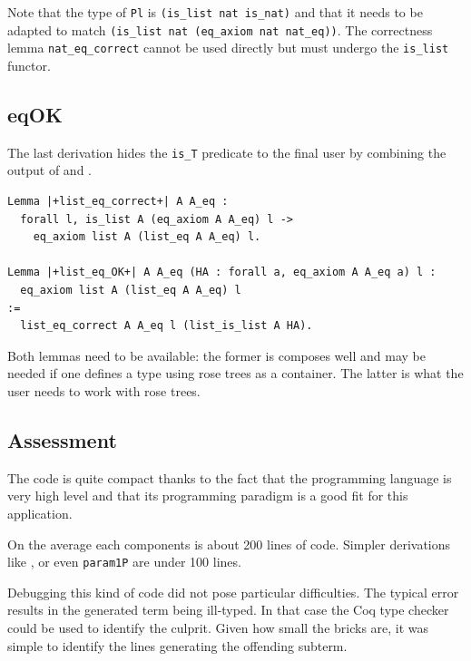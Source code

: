 \documentclass[sigplan,10pt,review]{acmart}\settopmatter{printfolios=true,printccs=false,printacmref=false}
\newcommand{\derive}[1]{\keys{#1}}
\begin{document}
\noindent
Note that the type of \lstinline+Pl+ is
\lstinline+(is_list nat is_nat)+ and that it
needs to be adapted to match
\lstinline+(is_list nat (eq_axiom nat nat_eq))+.
The correctness lemma \lstinline+nat_eq_correct+ cannot be used directly
but must undergo the \lstinline+is_list+ functor.

\subsection{eqOK} %

The last derivation hides the \lstinline+is_T+ predicate
to the final user by combining the output of
\derive{eqcorrect} and \derive{param1P}.

\begin{minipage}{\textwidth}\begin{lstlisting}
Lemma |+list_eq_correct+| A A_eq :
  forall l, is_list A (eq_axiom A A_eq) l ->
    eq_axiom list A (list_eq A A_eq) l.

Lemma |+list_eq_OK+| A A_eq (HA : forall a, eq_axiom A A_eq a) l :
  eq_axiom list A (list_eq A A_eq) l
:=
  list_eq_correct A A_eq l (list_is_list A HA).
\end{lstlisting}\end{minipage}

\noindent
Both lemmas need to be available: the former is composes well
and may be needed if one defines a type using rose trees as
a container. The latter is what the user needs to work with
rose trees.

\subsection{Assessment} %

The code is quite compact thanks to the fact that the programming
language is very high level and that its programming paradigm is a good
fit for this application.

On the average each components is about 200 lines of code.
Simpler derivations like \derive{projK}, \derive{isK} or even
\lstinline{param1P} are under 100 lines.

Debugging this kind of code did not pose particular difficulties.
The typical error results in the generated term being ill-typed.
In that case the Coq type checker could be used to identify the
culprit. Given how small the bricks are, it was simple to identify
the lines generating the offending subterm.
\end{document}
